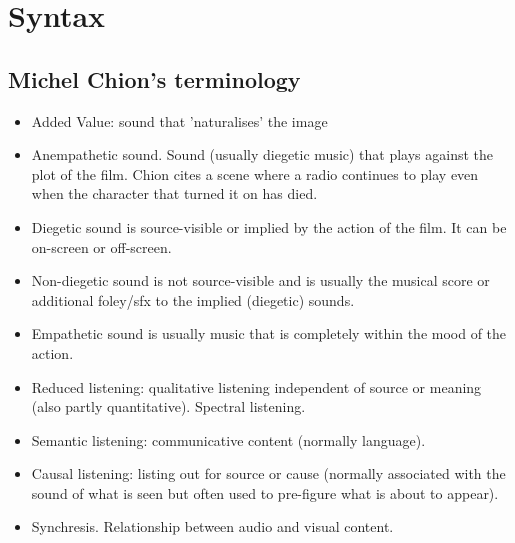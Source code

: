 
\chapter{Syntax}
\label{syntax}

\section{Michel Chion's terminology}
\begin{itemize}
\item Added Value: sound that 'naturalises' the image
\item Anempathetic sound. Sound (usually diegetic music) that plays against the plot of the film. Chion cites a scene where a radio continues to play even when the character that turned it on has died.
\item Diegetic sound is source-visible or implied by the action of the film. It can be on-screen or off-screen.
\item Non-diegetic sound is not source-visible and is usually the musical score or additional foley/sfx to the implied (diegetic) sounds.
\item Empathetic sound is usually music that is completely within the mood of the action.
\item Reduced listening: qualitative listening independent of source or meaning (also partly quantitative). Spectral listening.
\item Semantic listening: communicative content (normally language).
\item Causal listening: listing out for source or cause (normally associated with the sound of what is seen but often used to pre-figure what is about to appear). 
\item Synchresis. Relationship between audio and visual content.
\end{itemize}

